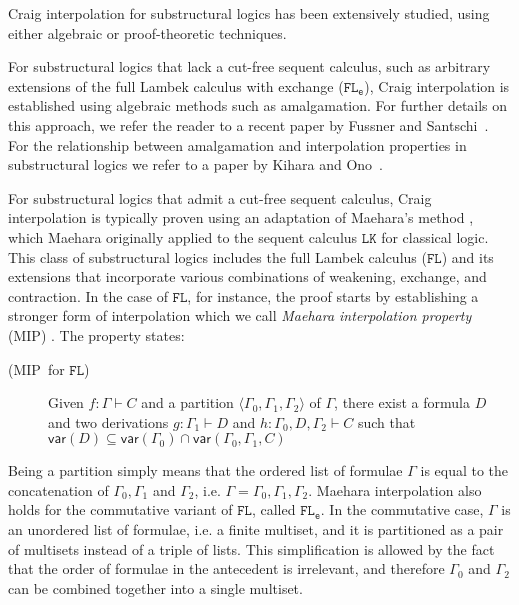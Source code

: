 \documentclass[sn-mathphys-num]{sn-jnl}%
\newcommand{\GG}{\Gamma}
\newcommand{\mf}[1]{\mathsf{#1}}
\newcommand{\vars}[1]{\mf{var} (#1)}
\newcommand{\FL}{$\mathtt{FL}$}
\newcommand{\FLe}{$\mathtt{FL_e}$}
\newcommand{\MIP}{\textsf{MIP}}
\newcommand{\niccolo}[1]{\textcolor{red}{NV: #1}}
\theoremstyle{thmstyleone}%
\theoremstyle{thmstyletwo}%
\theoremstyle{thmstylethree}%
\begin{document}
Craig interpolation for substructural logics has been extensively studied, using either algebraic or proof-theoretic techniques. 

For substructural logics that lack a cut-free sequent calculus, such as arbitrary extensions of the full Lambek calculus with exchange (\FLe), Craig interpolation is established using algebraic methods such as amalgamation.
For further details on this approach, we refer the reader to a recent paper by Fussner and Santschi~\cite{Fussner2024}.
For the relationship between amalgamation and interpolation properties in substructural logics we refer to a paper by Kihara and Ono~\cite{Kihara2009}.

For substructural logics that admit a cut-free sequent calculus, Craig interpolation is typically proven using an adaptation of Maehara's method \cite{maehara1961}, which Maehara originally applied to the sequent calculus $\mathtt{LK}$ for classical logic.
This class of substructural logics includes the full Lambek calculus (\FL) and its extensions that incorporate various combinations of weakening, exchange, and contraction.
In the case of \FL, for instance, the proof starts by establishing a stronger form of interpolation which we call \emph{Maehara interpolation property} (\MIP) \cite{ono:proof:nonclassical:1998}. 
The property states:
\begin{description}
  \item[(\MIP~for \FL)] Given $f : \GG \vdash C$ and a partition $\langle \GG_0, \GG_1, \GG_2 \rangle$ of $\GG$, there exist a formula $D$ and two derivations $g : \GG_1 \vdash D$ and $h : \GG_0, D, \GG_2 \vdash C$ such that $\vars{D} \subseteq \vars{\GG_0} \cap \vars{\GG_0, \GG_1, C}$
\end{description}
Being a partition simply means that the ordered list of formulae $\GG$ is equal to the concatenation of $\GG_0, \GG_1$ and $\GG_2$, i.e. $\GG = \GG_0, \GG_1, \GG_2$.
Maehara interpolation also holds for the commutative variant of \FL, called \FLe.
In the commutative case, $\GG$ is an unordered list of formulae, i.e. a finite multiset, and it is partitioned as a pair of multisets instead of a triple of lists.
This simplification is allowed by the fact that the order of formulae in the antecedent is irrelevant, and therefore $\GG_0$ and $\GG_2$ can be combined together into a single multiset.
\end{document}
